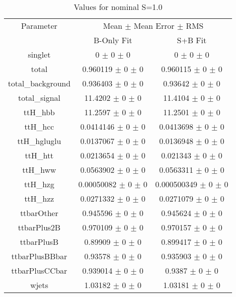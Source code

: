 \begin{table}
\centering
\caption{Values for nominal S=1.0}
\begin{tabular}{ccc}
\toprule
Parameter 	& \multicolumn{2}{c}{Mean $\pm$ Mean Error $\pm$ RMS}\\
 	& B-Only Fit & S+B Fit\\
\midrule
singlet 	& \num{0} $\pm$ \num{0} $\pm$ \num{0} 	& \num{0} $\pm$ \num{0} $\pm$ \num{0}\\
total 	& \num{0.960119} $\pm$ \num{0} $\pm$ \num{0} 	& \num{0.960115} $\pm$ \num{0} $\pm$ \num{0}\\
total\_background 	& \num{0.936403} $\pm$ \num{0} $\pm$ \num{0} 	& \num{0.93642} $\pm$ \num{0} $\pm$ \num{0}\\
total\_signal 	& \num{11.4202} $\pm$ \num{0} $\pm$ \num{0} 	& \num{11.4104} $\pm$ \num{0} $\pm$ \num{0}\\
ttH\_hbb 	& \num{11.2597} $\pm$ \num{0} $\pm$ \num{0} 	& \num{11.2501} $\pm$ \num{0} $\pm$ \num{0}\\
ttH\_hcc 	& \num{0.0414146} $\pm$ \num{0} $\pm$ \num{0} 	& \num{0.0413698} $\pm$ \num{0} $\pm$ \num{0}\\
ttH\_hgluglu 	& \num{0.0137067} $\pm$ \num{0} $\pm$ \num{0} 	& \num{0.0136948} $\pm$ \num{0} $\pm$ \num{0}\\
ttH\_htt 	& \num{0.0213654} $\pm$ \num{0} $\pm$ \num{0} 	& \num{0.021343} $\pm$ \num{0} $\pm$ \num{0}\\
ttH\_hww 	& \num{0.0563902} $\pm$ \num{0} $\pm$ \num{0} 	& \num{0.0563311} $\pm$ \num{0} $\pm$ \num{0}\\
ttH\_hzg 	& \num{0.00050082} $\pm$ \num{0} $\pm$ \num{0} 	& \num{0.000500349} $\pm$ \num{0} $\pm$ \num{0}\\
ttH\_hzz 	& \num{0.0271332} $\pm$ \num{0} $\pm$ \num{0} 	& \num{0.0271079} $\pm$ \num{0} $\pm$ \num{0}\\
ttbarOther 	& \num{0.945596} $\pm$ \num{0} $\pm$ \num{0} 	& \num{0.945624} $\pm$ \num{0} $\pm$ \num{0}\\
ttbarPlus2B 	& \num{0.970109} $\pm$ \num{0} $\pm$ \num{0} 	& \num{0.970157} $\pm$ \num{0} $\pm$ \num{0}\\
ttbarPlusB 	& \num{0.89909} $\pm$ \num{0} $\pm$ \num{0} 	& \num{0.899417} $\pm$ \num{0} $\pm$ \num{0}\\
ttbarPlusBBbar 	& \num{0.93578} $\pm$ \num{0} $\pm$ \num{0} 	& \num{0.935903} $\pm$ \num{0} $\pm$ \num{0}\\
ttbarPlusCCbar 	& \num{0.939014} $\pm$ \num{0} $\pm$ \num{0} 	& \num{0.9387} $\pm$ \num{0} $\pm$ \num{0}\\
wjets 	& \num{1.03182} $\pm$ \num{0} $\pm$ \num{0} 	& \num{1.03181} $\pm$ \num{0} $\pm$ \num{0}\\
\bottomrule
\end{tabular}
\end{table}